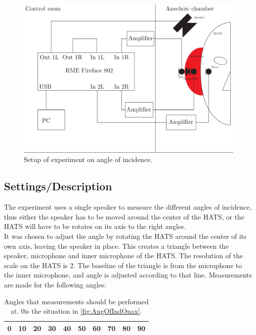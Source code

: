 \begin{figure}[H]
	\centering
	\includegraphics[width=\textwidth]{../Journal/Experiments/AngleOfIncidence/AngleOfIncidenceSetup.pdf}
	\caption{Setup of experiment on angle of incidence.}
	\label{Fig:AngleOfIncidenceSetup}
\end{figure}



\subsection{Settings/Description}\label{sec:AngleDescription}
The experiment uses a single speaker to measure the  different angles of incidence, thus either the speaker has to be moved around the center of the HATS, or the HATS will have to be rotates on its axis to the right angles. \\
It was chosen to adjust the angle by rotating the HATS around the center of its own axis, leaving the speaker in place. This creates a triangle between the speaker, microphone and inner microphone of the HATS. The resolution of the scale on the HATS is 2\degrees. The baseline of the triangle is from the microphone to the inner microphone, and angle is adjusted according to that line.
Measurements are made for the following angles:
\begin{table}[H]
	\centering
	\begin{tabular}{c c c c c c c c c c} \toprule
		0\degrees & 10\degrees & 20\degrees & 30\degrees & 40\degrees & 50\degrees & 60\degrees & 70\degrees & 80\degrees & 90\degrees \\ \bottomrule
	\end{tabular}
\caption{Angles that measurements should be performed at. 0\degrees  is the situation in \autoref{fig:AngOfIndOnax}.}
\label{Tab:AngleOfInciMeasAngles}
\end{table}
 

